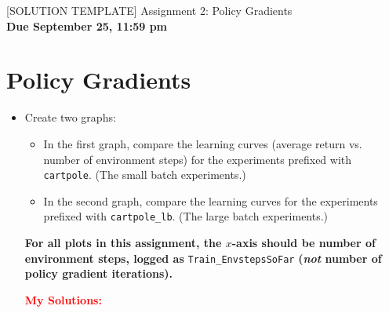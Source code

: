 \documentclass{article}
\begin{document}
\newcommand*{\MYSOLUTION}[0]{\textcolor{red}{\textbf{My Solutions: }}}

\begin{centering}
        {\Large [SOLUTION TEMPLATE] Assignment 2: Policy Gradients} \\
        \vspace{.25cm}
        \textbf{Due September 25, 11:59 pm} \\
\end{centering}

\setcounter{section}{2}
\section{Policy Gradients}
\begin{itemize}
\item Create two graphs:
\begin{itemize}
\item In the first graph, compare the learning curves (average return vs. number of environment steps) for the experiments prefixed with \verb|cartpole|. (The small batch experiments.)
\item In the second graph, compare the learning curves for the experiments prefixed with \verb|cartpole_lb|. (The large batch experiments.)
\end{itemize}
\textbf{For all plots in this assignment, the $x$-axis should be number of environment steps, logged as} \verb|Train_EnvstepsSoFar| \textbf{(\textit{not} number of policy gradient iterations).}

\MYSOLUTION


\end{itemize}
\end{document}
